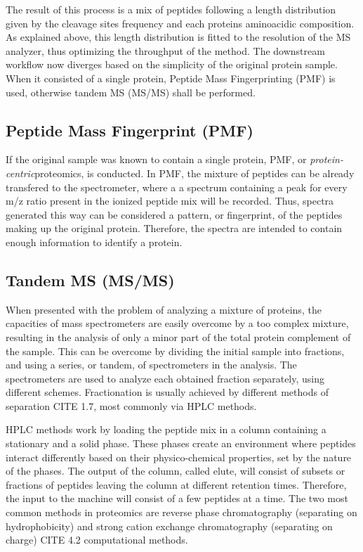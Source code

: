 \documentclass[11pt, a4paper]{report}
\begin{document}
The result of this process is a mix of peptides following a length distribution given by the cleavage sites frequency and each protein\textquotesingle s aminoacidic composition. As explained above, this length distribution is fitted to the resolution of the MS analyzer, thus optimizing the throughput of the method. The downstream workflow now diverges based on the simplicity of the original protein sample. When it consisted of a single protein, Peptide Mass Fingerprinting (PMF) is used, otherwise tandem MS (MS/MS) shall be performed. 

\subsection{Peptide Mass Fingerprint (PMF)}

If the original sample was known to contain a single protein, PMF, or \textit{protein-centric}proteomics, is conducted. In PMF, the mixture of peptides can be already transfered to the spectrometer, where a a spectrum containing a peak for every m/z ratio present in the ionized peptide mix will be recorded. Thus, spectra generated this way can be considered a pattern, or fingerprint, of the peptides making up the original protein. Therefore, the spectra are intended to contain enough information to identify a protein.


\subsection{Tandem MS (MS/MS)}

When presented with the problem of analyzing a mixture of proteins, the capacities of mass spectrometers are easily overcome by a too complex mixture, resulting in the analysis of only a minor part of the total protein complement of the sample. This can be overcome by dividing the initial sample into fractions, and using a series, or tandem, of spectrometers in the analysis. The spectrometers are used to analyze each obtained fraction separately, using different schemes. Fractionation is usually achieved by different methods of separation CITE 1.7, most commonly via HPLC methods. 

HPLC methods work by loading the peptide mix in a column containing a stationary and a solid phase. These phases create an environment where peptides interact differently based on their physico-chemical properties, set by the nature of the phases. The output of the column, called elute, will consist of subsets or fractions of peptides leaving the column at different retention times. Therefore, the input to the machine will consist of a few peptides at a time.
The two most common methods in proteomics are reverse phase chromatography (separating on hydrophobicity) and strong cation exchange chromatography (separating on charge)  CITE 4.2 computational methods.
\end{document}
